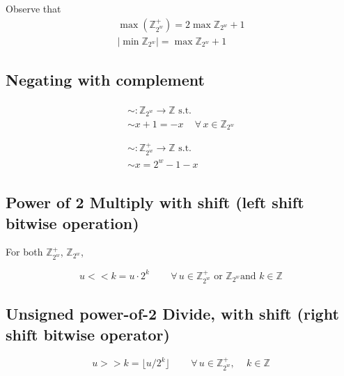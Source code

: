 \documentclass[10pt]{amsart}
\begin{document}
\begin{multicols*}{2}
Observe that 
\begin{equation}
\begin{gathered}
\max{ \left( \mathbb{Z}^+_{2^w} \right) } = 2 \max{ \mathbb{Z}_{2^w} } + 1 \\
| \min{ \mathbb{Z}_{2^w} } | = \max{ \mathbb{Z}_{2^w} } + 1
\end{gathered}
\end{equation}

\subsection{Negating with complement}

\begin{equation}
\begin{gathered}
\begin{gathered} 
\sim : \mathbb{Z}_{2^w} \to \mathbb{Z} \text{ s.t. } \\
\sim x + 1 = -x \quad \, \forall \, x \in \mathbb{Z}_{2^w} \\
\end{gathered}  \\
\begin{gathered} 
\sim : \mathbb{Z}^+_{2^w} \to \mathbb{Z} \text{ s.t. } \\
\sim x = 2^w- 1 -x 
\end{gathered}
\end{gathered}
\end{equation}

\subsection{Power of 2 Multiply with shift (left shift bitwise operation) }

For both $\mathbb{Z}^+_{2^w}$, $\mathbb{Z}_{2^w}$, 

\begin{equation}
 u << k = u \cdot 2^k \qquad \, \forall \, u \in \mathbb{Z}^+_{2^w} \text{ or } \mathbb{Z}_{2^w} \text{and } k \in \mathbb{Z}
\end{equation}

\subsection{Unsigned power-of-2 Divide, with shift (right shift bitwise operator)}

\begin{equation}
u >> k = \lfloor u / 2^k \rfloor \qquad \, \forall \, u \in \mathbb{Z}^+_{2^w}, \quad \, k \in \mathbb{Z}  
\end{equation}


\end{multicols*}
\end{document}
